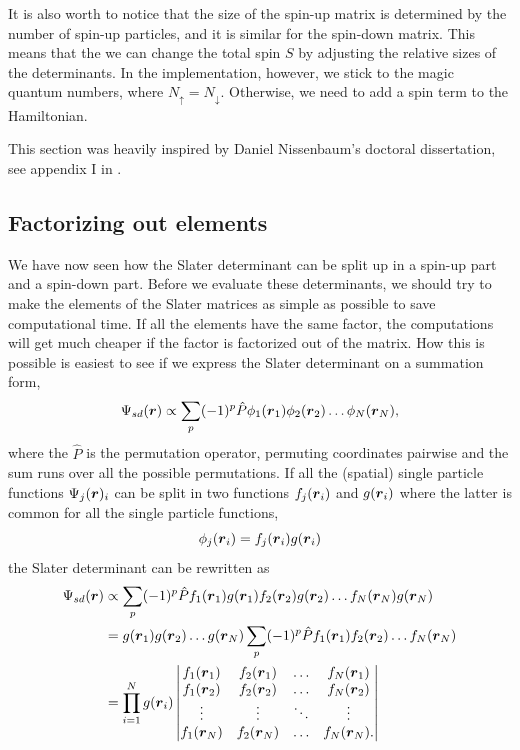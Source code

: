 It is also worth to notice that the size of the spin-up matrix is determined by the number of spin-up particles, and it is similar for the spin-down matrix. This means that the we can change the total spin $S$ by adjusting the relative sizes of the determinants. In the implementation, however, we stick to the magic quantum numbers, where $N_{\uparrow}=N_{\downarrow}$. Otherwise, we need to add a spin term to the Hamiltonian.

This section was heavily inspired by Daniel Nissenbaum's doctoral dissertation, see appendix I in \cite{nissenbaum_stochastic_2008}.

\subsection{Factorizing out elements} \label{sec:factorizing}
We have now seen how the Slater determinant can be split up in a spin-up part and a spin-down part. Before we evaluate these determinants, we should try to make the elements of the Slater matrices as simple as possible to save computational time. If all the elements have the same factor, the computations will get much cheaper if the factor is factorized out of the matrix. How this is possible is easiest to see if we express the Slater determinant on a summation form,
\begin{equation}
\Psi_{sd}(\boldsymbol{{r}})\propto\sum_{p}(-1)^p\hat{P}\phi_1(\boldsymbol{{r}}_1)\phi_2(\boldsymbol{{r}}_2)\hdots\phi_N(\boldsymbol{{r}}_N),
\label{eq:slatersum}
\end{equation}
where the $\hat{P}$ is the permutation operator, permuting coordinates pairwise and the sum runs over all the possible permutations. If all the (spatial) single particle functions $\Psi_j(\boldsymbol{{r}})_i$ can be split in two functions $f_j(\boldsymbol{{r}}_i)$ and $g(\boldsymbol{{r}}_i)$ where the latter is common for all the single particle functions,
\begin{equation}
\phi_j(\boldsymbol{{r}}_i)=f_j(\boldsymbol{{r}}_i)g(\boldsymbol{{r}}_i)
\end{equation}
the Slater determinant can be rewritten as
\begin{equation}
\begin{aligned}
\Psi_{sd}(\boldsymbol{{r}})&\propto\sum_{p}(-1)^p\hat{P}f_1(\boldsymbol{{r}}_1)g(\boldsymbol{{r}}_1)f_2(\boldsymbol{{r}}_2)g(\boldsymbol{{r}}_2)\hdots f_N(\boldsymbol{{r}}_N)g(\boldsymbol{{r}}_N)\\
&=g(\boldsymbol{{r}}_1)g(\boldsymbol{{r}}_2)\hdots g(\boldsymbol{{r}}_N)\sum_{p}(-1)^p\hat{P}f_1(\boldsymbol{{r}}_1)f_2(\boldsymbol{{r}}_2)\hdots f_N(\boldsymbol{{r}}_N)\\
&=\prod_{i=1}^Ng(\boldsymbol{{r}}_i)
\begin{vmatrix}
f_1(\boldsymbol{r}_1) & f_2(\boldsymbol{r}_1) & \hdots & f_N(\boldsymbol{r}_1)\\
f_1(\boldsymbol{r}_2) & f_2(\boldsymbol{r}_2) & \hdots & f_N(\boldsymbol{r}_2)\\
\vdots & \vdots & \ddots & \vdots \\
f_1(\boldsymbol{r}_N) & f_2(\boldsymbol{r}_N) & \hdots & f_N(\boldsymbol{r}_N).
\end{vmatrix}
\end{aligned}
\end{equation}
